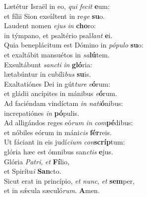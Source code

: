 \evenverse Lætétur Israël in eo, \textit{qui} \textit{fe}\textit{cit} \textbf{e}um:~\*\\
\evenverse et fílii Sion exsúltent in re\textit{ge} \textbf{su}o.\\
\oddverse Laudent nomen \textit{e}\textit{jus} \textit{in} \textbf{cho}ro:~\*\\
\oddverse in týmpano, et psaltério psal\textit{lant} \textbf{e}i.\\
\evenverse Quia beneplácitum est Dómino in \textit{pó}\textit{pu}\textit{lo} \textbf{su}o:~\*\\
\evenverse et exaltábit mansuétos in \textit{sa}\textbf{lú}tem.\\
\oddverse Exsultábunt \textit{san}\textit{cti} \textit{in} \textbf{gló}ria:~\*\\
\oddverse lætabúntur in cubíli\textit{bus} \textbf{su}is.\\
\evenverse Exaltatiónes Dei in gút\textit{tu}\textit{re} \textit{e}\textbf{ó}rum:~\*\\
\evenverse et gládii ancípites in mánibus \textit{e}\textbf{ó}rum.\\
\oddverse Ad faciéndam vindíctam \textit{in} \textit{na}\textit{ti}\textbf{ó}nibus:~\*\\
\oddverse increpatiónes \textit{in} \textbf{pó}pulis.\\
\evenverse Ad alligándos reges eó\textit{rum} \textit{in} \textit{com}\textbf{pé}dibus:~\*\\
\evenverse et nóbiles eórum in máni\textit{cis} \textbf{fér}reis.\\
\oddverse Ut fáciant in eis judí\textit{ci}\textit{um} \textit{con}\textbf{scríp}tum:~\*\\
\oddverse glória hæc est ómnibus san\textit{ctis} \textbf{e}jus.\\
\evenverse Glória \textit{Pa}\textit{tri}, \textit{et} \textbf{Fí}lio,~\*\\
\evenverse et Spirítu\textit{i} \textbf{San}cto.\\
\oddverse Sicut erat in princípio, \textit{et} \textit{nunc}, \textit{et} \textbf{sem}per,~\*\\
\oddverse et in sǽcula sæculó\textit{rum}. \textbf{A}men.\\
